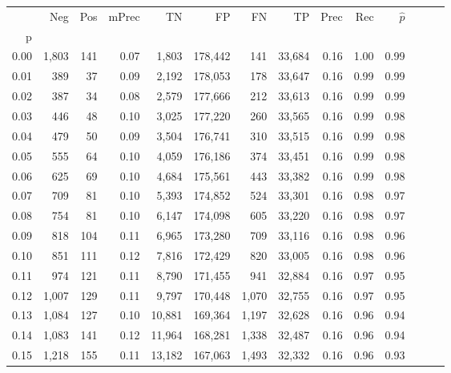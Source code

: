 \begin{tabular}{rrrrrrrrrrrrrr}
\toprule
{} &    Neg &  Pos & mPrec &       TN &       FP &      FN &      TP &  Prec &   Rec & $\hat{p}$ \\
p    &        &      &       &          &          &         &         &       &       &           \\
\midrule
0.00 &  1,803 &  141 &  0.07 &    1,803 &  178,442 &     141 &  33,684 &  0.16 &  1.00 &      0.99 \\
0.01 &    389 &   37 &  0.09 &    2,192 &  178,053 &     178 &  33,647 &  0.16 &  0.99 &      0.99 \\
0.02 &    387 &   34 &  0.08 &    2,579 &  177,666 &     212 &  33,613 &  0.16 &  0.99 &      0.99 \\
0.03 &    446 &   48 &  0.10 &    3,025 &  177,220 &     260 &  33,565 &  0.16 &  0.99 &      0.98 \\
0.04 &    479 &   50 &  0.09 &    3,504 &  176,741 &     310 &  33,515 &  0.16 &  0.99 &      0.98 \\
0.05 &    555 &   64 &  0.10 &    4,059 &  176,186 &     374 &  33,451 &  0.16 &  0.99 &      0.98 \\
0.06 &    625 &   69 &  0.10 &    4,684 &  175,561 &     443 &  33,382 &  0.16 &  0.99 &      0.98 \\
0.07 &    709 &   81 &  0.10 &    5,393 &  174,852 &     524 &  33,301 &  0.16 &  0.98 &      0.97 \\
0.08 &    754 &   81 &  0.10 &    6,147 &  174,098 &     605 &  33,220 &  0.16 &  0.98 &      0.97 \\
0.09 &    818 &  104 &  0.11 &    6,965 &  173,280 &     709 &  33,116 &  0.16 &  0.98 &      0.96 \\
0.10 &    851 &  111 &  0.12 &    7,816 &  172,429 &     820 &  33,005 &  0.16 &  0.98 &      0.96 \\
0.11 &    974 &  121 &  0.11 &    8,790 &  171,455 &     941 &  32,884 &  0.16 &  0.97 &      0.95 \\
0.12 &  1,007 &  129 &  0.11 &    9,797 &  170,448 &   1,070 &  32,755 &  0.16 &  0.97 &      0.95 \\
0.13 &  1,084 &  127 &  0.10 &   10,881 &  169,364 &   1,197 &  32,628 &  0.16 &  0.96 &      0.94 \\
0.14 &  1,083 &  141 &  0.12 &   11,964 &  168,281 &   1,338 &  32,487 &  0.16 &  0.96 &      0.94 \\
0.15 &  1,218 &  155 &  0.11 &   13,182 &  167,063 &   1,493 &  32,332 &  0.16 &  0.96 &      0.93 \\

\end{tabular}
